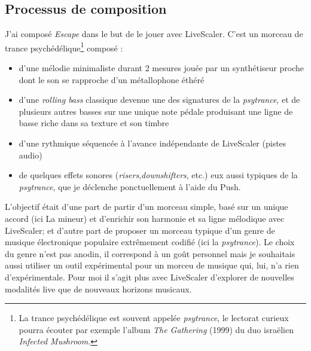 \subsection{Processus de composition}
\begin{comment}
  Liste des contraintes :
\begin{enumerate}
  \item Toutes les pistes doivent être MIDI : une piste audio ne serait pas impactée par les changements de gamme
  \item Pauvreté harmonique : le morceau doit être relativement pauvre harmoniquement, idéalement rester sur le même accord tout le long.
\end{enumerate}
Préparation d'une session pour utiliser Live Scaler
\begin{enumerate}
  \item Passer toutes les pistes en MIDI (utiliser des sampleurs pour les pistes audio )
  \item S'assurer qu'on ne sort pas de la tessiture des instruments
  \item Mettre les synthétiseurs et sampleurs en mode legato au maximum.
\end{enumerate}
\end{comment}


J'ai composé \emph{Escape} dans le but de le jouer avec LiveScaler. C'est un morceau de trance psychédélique\footnote{La trance psychédélique est souvent  appelée \emph{psytrance}, le lectorat curieux pourra écouter par exemple l'album \emph{The Gathering} (1999) du duo israëlien \emph{Infected Mushroom}.} composé  : 
\begin{itemize}
  \item d'une mélodie minimaliste durant 2 mesures jouée par un synthétiseur proche dont le son se rapproche d'un métallophone éthéré
  \item d'une \emph{rolling bass} classique devenue une des signatures de la \emph{psytrance}, et de plusieurs autres basses sur une unique note pédale produisant une ligne de basse riche dans sa texture et son timbre
  \item d'une rythmique séquencée à l'avance indépendante de LiveScaler (pistes audio)
  \item de quelques effets sonores (\emph{risers},\emph{downshifters}, etc.) eux aussi typiques de la \emph{psytrance}, que je déclenche ponctuellement à l'aide du Push.
\end{itemize}

L'objectif était d'une part de partir d'un morceau simple, basé sur un unique accord (ici La mineur) et d'enrichir son harmonie et sa ligne mélodique avec LiveScaler; et d'autre part de proposer un morceau typique d'un genre de musique électronique populaire extrêmement codifié (ici la \emph{psytrance}). Le choix du genre n'est pas anodin, il correspond à un goût personnel mais je souhaitais aussi utiliser un outil expérimental pour un morceu de musique qui, lui, n'a rien d'expérimentale. Pour moi il s'agit plus avec LiveScaler d'explorer de nouvelles modalités live que de nouveaux horizons musicaux.
